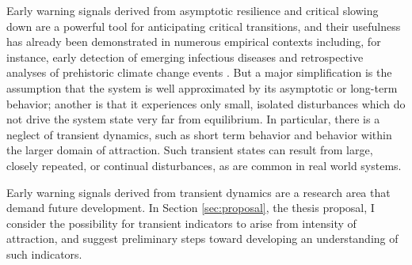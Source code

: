 Early warning signals derived from asymptotic resilience and critical slowing down are a powerful tool for anticipating critical transitions, and their usefulness has already been demonstrated in numerous empirical contexts including, for instance, early detection of emerging infectious diseases \cite{brettDynamicalFootprintsEnable2020} and retrospective analyses of prehistoric climate change events \cite{dakosSlowingEarlyWarning2008a}. But a major simplification is the assumption that the system is well approximated by its asymptotic or long-term behavior; another is that it experiences only small, isolated disturbances which do not drive the system state very far from equilibrium. In particular, there is a neglect of transient dynamics, such as short term behavior and behavior within the larger domain of attraction. Such transient states can result from large, closely repeated, or continual disturbances, as are common in real world systems. 


%

Early warning signals derived from transient dynamics are a research area that demand future development. In Section \ref{sec:proposal}, the thesis proposal, I consider the possibility for transient indicators to arise from intensity of attraction, and suggest preliminary steps toward developing an understanding of such indicators. 








